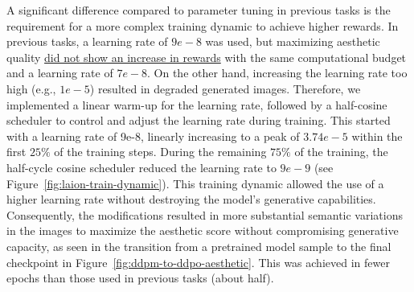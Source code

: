 \noindent A significant difference compared to parameter tuning in previous tasks is the requirement for a more complex training dynamic to achieve higher rewards. In previous tasks, a learning rate of $9e-8$ was used, but maximizing aesthetic quality \href{https://wandb.ai/alcazar90/ddpo-aesthetic-ddpm-celebahq256/runs/omta8esy}{did not show an increase in rewards} with the same computational budget and a learning rate of $7e-8$. On the other hand, increasing the learning rate too high (e.g., \href{https://wandb.ai/alcazar90/ddpo-aesthetic-ddpm-celebahq256/runs/3lb094dk}{$1e-5$}) resulted in degraded generated images. Therefore, we implemented a linear warm-up for the learning rate, followed by a half-cosine scheduler to control and adjust the learning rate during training. This started with a learning rate of 9e-8, linearly increasing to a peak of $3.74e-5$ within the first $25\%$ of the training steps. During the remaining $75\%$ of the training, the half-cycle cosine scheduler reduced the learning rate to $9e-9$ (see Figure~\ref{fig:laion-train-dynamic}). This training dynamic allowed the use of a higher learning rate without destroying the model's generative capabilities. Consequently, the modifications resulted in more substantial semantic variations in the images to maximize the aesthetic score without compromising generative capacity, as seen in the transition from a pretrained model sample to the final checkpoint in Figure~\ref{fig:ddpm-to-ddpo-aesthetic}. This was achieved in fewer epochs than those used in previous tasks (about half). \\

